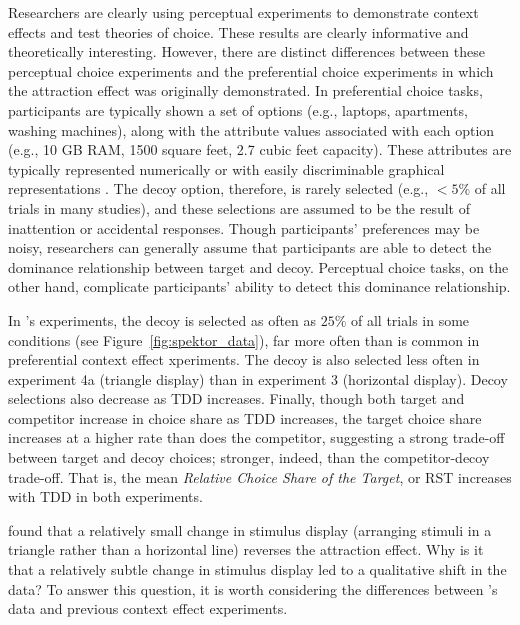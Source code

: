 Researchers are clearly using perceptual experiments to demonstrate context effects and test theories of choice. These results are clearly informative and theoretically interesting. However, there are distinct differences between these perceptual choice experiments and the preferential choice experiments in which the attraction effect was originally demonstrated. In preferential choice tasks, participants are typically shown a set of options (e.g., laptops, apartments, washing machines), along with the attribute values associated with each option (e.g., 10 GB RAM, 1500 square feet, 2.7 cubic feet capacity). These attributes are typically represented numerically \parencite{hayes2024attribute,banerjeeFactorsThatPromote2024} or with easily discriminable graphical representations \parencite{cataldoComparisonProcessAccount2019b}. The decoy option, therefore, is rarely selected (e.g., $<5\%$ of all trials in many studies), and these selections are assumed to be the result of inattention or accidental responses. Though participants' preferences may be noisy, researchers can generally assume that participants are able to detect the dominance relationship between target and decoy. Perceptual choice tasks, on the other hand, complicate participants' ability to detect this dominance relationship.

In \textcite{spektorWhenGoodLooks2018b}'s experiments, the decoy is selected as often as $25\%$ of all trials in some conditions (see Figure~\ref{fig:spektor_data}), far more often than is common in preferential context effect xperiments. The decoy is also selected less often in experiment 4a (triangle display) than in experiment 3 (horizontal display). Decoy selections also decrease as TDD increases. Finally, though both target and competitor increase in choice share as TDD increases, the target choice share increases at a higher rate than does the competitor, suggesting a strong trade-off between target and decoy choices; stronger, indeed, than the competitor-decoy trade-off. That is, the mean \textit{Relative Choice Share of the Target}, or RST \parencite{berkowitschRigorouslyTestingMultialternative2014b} increases with TDD in both experiments. 

\textcite{spektorWhenGoodLooks2018b} found that a relatively small change in stimulus display (arranging stimuli in a triangle rather than a horizontal line) reverses the attraction effect. Why is it that a relatively subtle change in stimulus display led to a qualitative shift in the data? To answer this question, it is worth considering the differences between \textcite{spektorWhenGoodLooks2018b}'s data and previous context effect experiments. 

